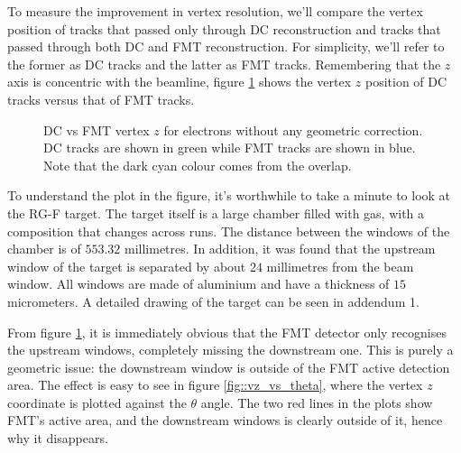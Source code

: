     To measure the improvement in vertex resolution, we'll compare the vertex position of tracks that passed only through DC reconstruction and tracks that passed through both DC and FMT reconstruction.
    For simplicity, we'll refer to the former as DC tracks and the latter as FMT tracks.
    Remembering that the $z$ axis is concentric with the beamline, figure \ref{fig::dc_vs_fmt_vz} shows the vertex $z$ position of DC tracks versus that of FMT tracks.

    \begin{figure}[h!]
        \centering{}
        \caption[DC vs FMT $z$ without geometric correction]{DC vs FMT vertex $z$ for electrons without any geometric correction. DC tracks are shown in green while FMT tracks are shown in blue. Note that the dark cyan colour comes from the overlap.}
        \label{fig::dc_vs_fmt_vz}
    \end{figure}

    To understand the plot in the figure, it's worthwhile to take a minute to look at the RG-F target.
    The target itself is a large chamber filled with gas, with a composition that changes across runs.
    The distance between the windows of the chamber is of $553.32$ millimetres.
    In addition, it was found that the upstream window of the target is separated by about $24$ millimetres from the beam window.
    All windows are made of aluminium and have a thickness of $15$ micrometers. %
    A detailed drawing of the target can be seen in addendum 1.

    From figure \ref{fig::dc_vs_fmt_vz}, it is immediately obvious that the FMT detector only recognises the upstream windows, completely missing the downstream one.
    This is purely a geometric issue:
    the downstream window is outside of the FMT active detection area.
    The effect is easy to see in figure \ref{fig::vz_vs_theta}, where the vertex $z$ coordinate is plotted against the $\theta$ angle.
    The two red lines in the plots show FMT's active area, and the downstream windows is clearly outside of it, hence why it disappears.

